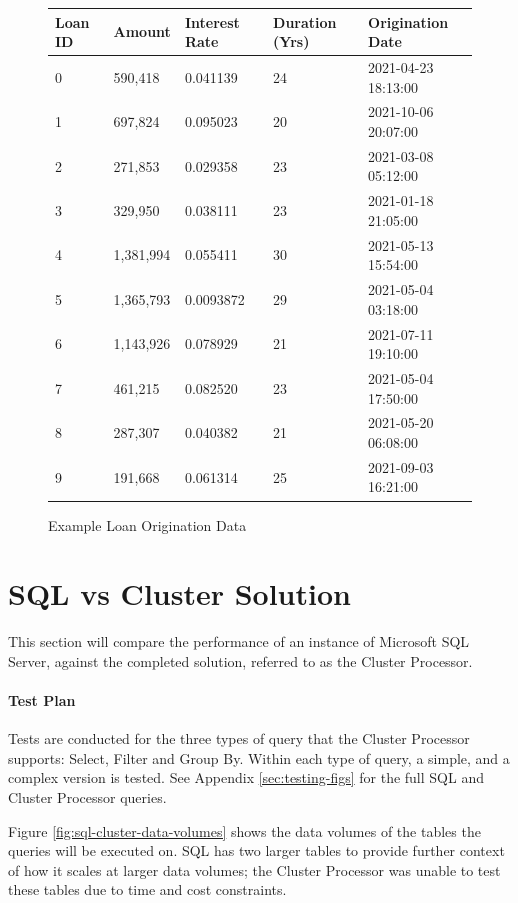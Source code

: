 \begin{figure}[ht]
	\centering
	\begin{tabular}{| l | l | l | l | l |}
		\hline
		\textbf{Loan ID} & \textbf{Amount} & \textbf{Interest Rate} & \textbf{Duration (Yrs)} & \textbf{Origination Date} \\ \hline 
		0 & 590,418 & 0.041139 & 24 & 2021-04-23 18:13:00   \\ \hline
		1 & 697,824 & 0.095023 & 20 & 2021-10-06 20:07:00    \\ \hline
		2 & 271,853 & 0.029358 & 23 & 2021-03-08 05:12:00    \\ \hline
		3 & 329,950 & 0.038111 & 23 & 2021-01-18 21:05:00    \\ \hline
		4 & 1,381,994 & 0.055411 & 30 & 2021-05-13 15:54:00  \\ \hline
		5 & 1,365,793 & 0.0093872 & 29 & 2021-05-04 03:18:00  \\ \hline
		6 & 1,143,926 & 0.078929 & 21 & 2021-07-11 19:10:00   \\ \hline
		7 & 461,215 & 0.082520 & 23 & 2021-05-04 17:50:00    \\ \hline
		8 & 287,307 & 0.040382 & 21 & 2021-05-20 06:08:00   \\ \hline
		9 & 191,668 & 0.061314 & 25 & 2021-09-03 16:21:00    \\ \hline
	\end{tabular}
	\caption{Example Loan Origination Data}
	\label{fig:fake-loan-data}
\end{figure}

\section{SQL vs Cluster Solution}
This section will compare the performance of an instance of Microsoft SQL Server, against the completed solution, referred to as the Cluster Processor. 

\paragraph{Test Plan}
Tests are conducted for the three types of query that the Cluster Processor supports: Select, Filter and Group By. Within each type of query, a simple, and a complex version is tested. See Appendix \ref{sec:testing-figs} for the full SQL and Cluster Processor queries.

Figure \ref{fig:sql-cluster-data-volumes} shows the data volumes of the tables the queries will be executed on. SQL has two larger tables to provide further context of how it scales at larger data volumes; the Cluster Processor was unable to test these tables due to time and cost constraints.

